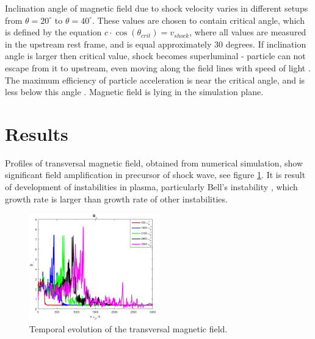 \documentclass[a4paper]{jpconf}
\begin{document}
	Inclination angle of magnetic field due to shock velocity varies in different setups from $\theta = 20^\circ$ to $\theta = 40^\circ$. These values are chosen to contain critical angle, which is defined by the equation $c\cdot \cos(\theta_{crit})=v_{shock}$, where all values are measured in the upstream rest frame, and is equal approximately $30$ degrees. If inclination angle is larger then critical value, shock becomes superluminal - particle can not escape from it to upstream, even moving along the field lines with speed of light \cite{Pelletier2017,Sironi2011}. The maximum efficiency of particle acceleration is near the critical angle, and is less below this angle \cite{Romansky18}. Magnetic field is lying in the simulation plane.
	
	
	\section{Results}
	
	Profiles of transversal magnetic field, obtained from numerical simulation, show significant field amplification in precursor of shock wave, see figure \ref{field}. It is result of development of instabilities in plasma, particularly Bell's instability \cite{Bell04}, which growth rate is larger than growth rate of other instabilities.
	
	\begin{figure}[h!]
		\centering
		\includegraphics[width=0.50\textwidth]{fig/Bnorm.png} 
		\caption{Temporal evolution of the transversal magnetic field.}
		\label{field}
	\end{figure}
	
\end{document}
